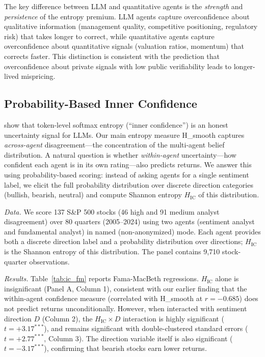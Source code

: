 \documentclass[12pt,a4paper]{article}
\begin{document}
The key difference between LLM and quantitative agents is the \textit{strength} and \textit{persistence} of the entropy premium. LLM agents capture overconfidence about qualitative information (management quality, competitive positioning, regulatory risk) that takes longer to correct, while quantitative agents capture overconfidence about quantitative signals (valuation ratios, momentum) that corrects faster. This distinction is consistent with the \citet{Daniel1998} prediction that overconfidence about private signals with low public verifiability leads to longer-lived mispricing.

\subsection{Probability-Based Inner Confidence}

\citet{Chen2025inner} show that token-level softmax entropy (``inner confidence'') is an honest uncertainty signal for LLMs. Our main entropy measure H\_smooth captures \textit{across-agent} disagreement---the concentration of the multi-agent belief distribution. A natural question is whether \textit{within-agent} uncertainty---how confident each agent is in its own rating---also predicts returns. We answer this using probability-based scoring: instead of asking agents for a single sentiment label, we elicit the full probability distribution over discrete direction categories (bullish, bearish, neutral) and compute Shannon entropy $H_{\text{IC}}$ of this distribution.

\textit{Data.} We score 137 S\&P 500 stocks (46 high and 91 medium analyst disagreement) over 80 quarters (2005--2024) using two agents (sentiment analyst and fundamental analyst) in named (non-anonymized) mode. Each agent provides both a discrete direction label and a probability distribution over directions; $H_{\text{IC}}$ is the Shannon entropy of this distribution. The panel contains 9,710 stock-quarter observations.

\textit{Results.} Table~\ref{tab:ic_fm} reports Fama-MacBeth regressions. $H_{\text{IC}}$ alone is insignificant (Panel A, Column 1), consistent with our earlier finding that the within-agent confidence measure (correlated with H\_smooth at $r = -0.685$) does not predict returns unconditionally. However, when interacted with sentiment direction $D$ (Column 2), the $H_{\text{IC}} \times D$ interaction is highly significant ($t = +3.17^{***}$), and remains significant with double-clustered standard errors ($t = +2.77^{***}$, Column 3). The direction variable itself is also significant ($t = -3.17^{***}$), confirming that bearish stocks earn lower returns.
\end{document}
